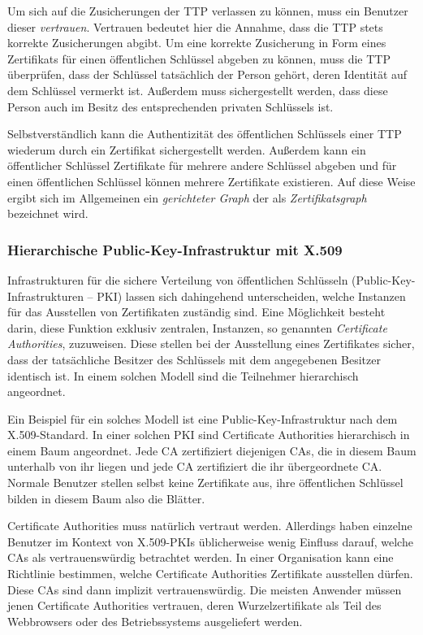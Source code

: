 Um sich auf die Zusicherungen der TTP verlassen zu können, muss ein
Benutzer dieser \emph{vertrauen}. Vertrauen bedeutet hier die Annahme,
dass die TTP stets korrekte Zusicherungen abgibt. Um eine korrekte
Zusicherung in Form eines Zertifikats für einen öffentlichen
Schlüssel abgeben zu können, muss die TTP überprüfen, dass der
Schlüssel tatsächlich der Person gehört, deren Identität auf
dem Schlüssel vermerkt ist. Außerdem muss sichergestellt werden,
dass diese Person auch im Besitz des entsprechenden privaten
Schlüssels ist.

Selbstverständlich kann die Authentizität des öffentlichen
Schlüssels einer TTP wiederum durch ein Zertifikat sichergestellt
werden. Außerdem kann ein öffentlicher Schlüssel Zertifikate
für mehrere andere Schlüssel abgeben und für einen
öffentlichen Schlüssel können mehrere Zertifikate
existieren. Auf diese Weise ergibt sich im Allgemeinen ein
\emph{gerichteter Graph} der als \emph{Zertifikatsgraph} bezeichnet
wird.

\subsubsection{Hierarchische Public-Key-Infrastruktur mit X.509}
\label{ch:Grundlagen:sec:PublicKeyCrypto:subsec:KeyAuth:subsubsec:PKI}

Infrastrukturen für die sichere Verteilung von öffentlichen
Schlüsseln (Public-Key-Infrastrukturen -- PKI) lassen sich
dahingehend unterscheiden, welche Instanzen für das Ausstellen von
Zertifikaten zuständig sind. Eine Möglichkeit besteht darin, diese
Funktion exklusiv zentralen, Instanzen, so genannten \emph{Certificate
  Authorities}, zuzuweisen. Diese stellen bei der Ausstellung eines
Zertifikates sicher, dass der tatsächliche Besitzer des Schlüssels
mit dem angegebenen Besitzer identisch ist. In einem solchen Modell
sind die Teilnehmer hierarchisch angeordnet. 

Ein Beispiel für ein solches Modell ist eine
Public-Key-Infrastruktur nach dem X.509-Standard. In einer solchen PKI
sind Certificate Authorities hierarchisch in einem Baum
angeordnet. Jede CA zertifiziert diejenigen CAs, die in diesem Baum
unterhalb von ihr liegen und jede CA zertifiziert die ihr
übergeordnete CA. Normale Benutzer stellen selbst keine Zertifikate
aus, ihre öffentlichen Schlüssel bilden in diesem Baum also die
Blätter.

Certificate Authorities muss natürlich vertraut werden. Allerdings
haben einzelne Benutzer im Kontext von X.509-PKIs üblicherweise
wenig Einfluss darauf, welche CAs als vertrauenswürdig betrachtet
werden. In einer Organisation kann eine Richtlinie bestimmen, welche
Certificate Authorities Zertifikate ausstellen dürfen. Diese CAs sind
dann implizit vertrauenswürdig. Die meisten Anwender müssen jenen
Certificate Authorities vertrauen, deren Wurzelzertifikate als Teil
des Webbrowsers oder des Betriebssystems ausgeliefert werden.

